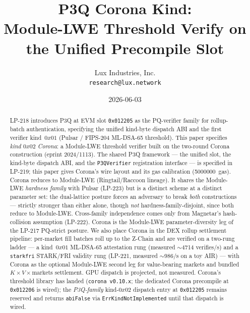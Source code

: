 \documentclass[11pt,a4paper]{article}
\title{P3Q Corona Kind:\\
       Module-LWE Threshold Verify on the Unified Precompile Slot}
\author{Lux Industries, Inc. \\
        \texttt{research@lux.network}}
\date{2026-06-03}
\begin{document}
\luxcoverpage

\begin{abstract}
LP-218 introduces P3Q at EVM slot \texttt{0x012205} as the
PQ-verifier family for rollup-batch authentication, specifying the
unified kind-byte dispatch ABI and the first verifier
kind~$0x01$ (Pulsar / FIPS-204 ML-DSA-65 threshold). This paper specifies \emph{kind $0x02$ Corona}: a Module-LWE
threshold verifier built on the two-round Corona construction
(eprint 2024/1113). The shared P3Q framework --- the unified slot,
the kind-byte dispatch ABI, and the \texttt{P3QVerifier}
registration interface --- is specified in LP-219; this paper
gives Corona's wire layout and its gas calibration
(\SI{5000000}{gas}). Corona reduces to Module-LWE (Ringtail/Raccoon
lineage). It shares the Module-LWE \emph{hardness family} with Pulsar
(LP-223) but is a distinct scheme at a distinct parameter set: the
dual-lattice posture forces an adversary to break \emph{both}
constructions --- strictly stronger than either alone, though
\emph{not} hardness-family-disjoint, since both reduce to Module-LWE.
Cross-family independence comes only from Magnetar's hash-collision
assumption (LP-222). Corona is the Module-LWE parameter-diversity leg of
the LP-217 PQ-strict posture. We also
place Corona in the DEX rollup settlement pipeline: per-market fill
batches roll up to the Z-Chain and are verified on a two-rung ladder
--- a kind~$0x01$ ML-DSA-65 attestation rung (measured
$\sim$\num{4714} verifies/s) and a \texttt{starkfri} STARK/FRI
validity rung (LP-221, measured $\sim$\num{986}/s on a toy AIR) ---
with Corona as the optional Module-LWE second leg for value-bearing
markets and bundled $K\times V\times\text{markets}$ settlement. GPU
dispatch is projected, not measured. Corona's threshold library has
landed (\texttt{corona v0.10.x}; the dedicated Corona precompile at
\texttt{0x012206} is wired); the \emph{P3Q-family} kind-$0x02$ dispatch
entry at \texttt{0x012205} remains reserved and returns \texttt{abiFalse}
via \texttt{ErrKindNotImplemented} until that dispatch is wired.
\end{abstract}

\tableofcontents
\newpage







\end{document}
